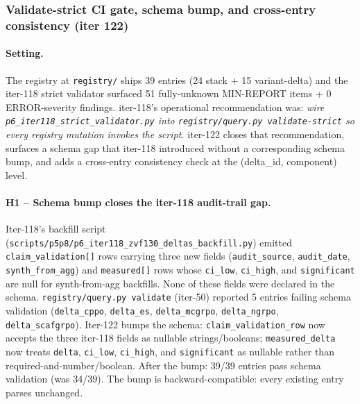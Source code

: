
\subsubsection{Validate-strict CI gate, schema bump, and cross-entry consistency (iter 122)}
\label{sec:p6-iter122-validate-strict}

\paragraph{Setting.}
The registry at \texttt{registry/} ships 39 entries (24 stack + 15
variant-delta) and the iter-118 strict validator surfaced 51 fully-unknown
MIN-REPORT items + 0 ERROR-severity findings. iter-118's operational
recommendation was: \emph{wire \texttt{p6\_iter118\_strict\_validator.py}
into \texttt{registry/query.py validate-strict} so every registry mutation
invokes the script.} iter-122 closes that recommendation, surfaces a
schema gap that iter-118 introduced without a corresponding schema bump,
and adds a cross-entry consistency check at the (delta\_id, component)
level.

\paragraph{H1 -- Schema bump closes the iter-118 audit-trail gap.}
Iter-118's backfill script
(\texttt{scripts/p5p8/p6\_iter118\_zvf130\_deltas\_backfill.py}) emitted
\texttt{claim\_validation[]} rows carrying three new fields
(\texttt{audit\_source}, \texttt{audit\_date}, \texttt{synth\_from\_agg})
and \texttt{measured[]} rows whose \texttt{ci\_low}, \texttt{ci\_high},
and \texttt{significant} are null for synth-from-agg backfills. None of
these fields were declared in the schema. \texttt{registry/query.py
validate} (iter-50) reported 5 entries failing schema validation
(\texttt{delta\_cppo}, \texttt{delta\_es}, \texttt{delta\_mcgrpo},
\texttt{delta\_ngrpo}, \texttt{delta\_scafgrpo}). Iter-122 bumps the
schema: \texttt{claim\_validation\_row} now accepts the three iter-118
fields as nullable strings/booleans; \texttt{measured\_delta} now treats
\texttt{delta}, \texttt{ci\_low}, \texttt{ci\_high}, and
\texttt{significant} as nullable rather than required-and-number/boolean.
After the bump: 39/39 entries pass schema validation (was 34/39). The
bump is backward-compatible: every existing entry parses unchanged.


